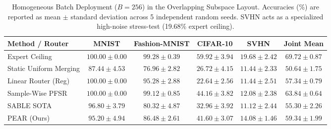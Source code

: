 \begin{table}[t]
\caption{Homogeneous Batch Deployment ($B = 256$) in the Overlapping Subspace Layout. Accuracies (\%) are reported as mean $\pm$ standard deviation across 5 independent random seeds. SVHN acts as a specialized high-noise stress-test (19.68\% expert ceiling).}
\label{tab:homogeneous}
\vskip 0.15in
\begin{center}
\begin{small}
\begin{sc}
\begin{tabular}{lccccc}
\toprule
Method / Router & MNIST & Fashion-MNIST & CIFAR-10 & SVHN & Joint Mean \\
\midrule
Expert Ceiling & $100.00 \pm 0.00$ & $99.28 \pm 0.39$ & $59.92 \pm 3.94$ & $19.68 \pm 2.42$ & $\mathbf{69.72 \pm 0.87}$ \\
Static Uniform Merging & $87.44 \pm 4.53$ & $76.96 \pm 2.82$ & $26.72 \pm 4.15$ & $11.44 \pm 2.33$ & $\mathbf{50.64 \pm 1.75}$ \\
Linear Router (Reg) & $100.00 \pm 0.00$ & $95.28 \pm 2.88$ & $22.64 \pm 2.56$ & $11.44 \pm 2.51$ & $\mathbf{57.34 \pm 0.79}$ \\
Sample-Wise PFSR & $100.00 \pm 0.00$ & $99.12 \pm 0.85$ & $44.16 \pm 3.82$ & $12.08 \pm 2.38$ & $\mathbf{63.84 \pm 0.64}$ \\
SABLE SOTA & $96.80 \pm 3.79$ & $80.32 \pm 4.87$ & $32.96 \pm 3.92$ & $11.12 \pm 2.44$ & $\mathbf{55.30 \pm 2.26}$ \\
\midrule
PEAR (Ours) & $95.20 \pm 4.94$ & $86.48 \pm 2.61$ & $41.60 \pm 3.07$ & $14.08 \pm 1.46$ & $\mathbf{59.34 \pm 1.99}$ \\
\bottomrule
\end{tabular}
\end{sc}
\end{small}
\end{center}
\vskip -0.1in
\end{table}

